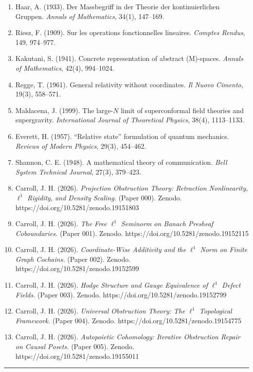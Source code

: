 \documentclass[
]{article}
\providecommand{\tightlist}{%
  \setlength{\itemsep}{0pt}\setlength{\parskip}{0pt}}
\begin{document}
\begin{enumerate}
\def\labelenumi{\arabic{enumi}.}
\tightlist
\item
  Haar, A. (1933). Der Massbegriff in der Theorie der kontinuierlichen
  Gruppen. \emph{Annals of Mathematics}, 34(1), 147--169.
\item
  Riesz, F. (1909). Sur les operations fonctionnelles lineaires.
  \emph{Comptes Rendus}, 149, 974--977.
\item
  Kakutani, S. (1941). Concrete representation of abstract (M)-spaces.
  \emph{Annals of Mathematics}, 42(4), 994--1024.
\item
  Regge, T. (1961). General relativity without coordinates. \emph{Il
  Nuovo Cimento}, 19(3), 558--571.
\item
  Maldacena, J. (1999). The large-\(N\) limit of superconformal field
  theories and supergravity. \emph{International Journal of Theoretical
  Physics}, 38(4), 1113--1133.
\item
  Everett, H. (1957). ``Relative state'' formulation of quantum
  mechanics. \emph{Reviews of Modern Physics}, 29(3), 454--462.
\item
  Shannon, C. E. (1948). A mathematical theory of communication.
  \emph{Bell System Technical Journal}, 27(3), 379--423.
\item
  Carroll, J. H. (2026). \emph{Projection Obstruction Theory: Retraction
  Nonlinearity, \(\ell^1\) Rigidity, and Density Scaling.} (Paper 000).
  Zenodo. https://doi.org/10.5281/zenodo.19151803
\item
  Carroll, J. H. (2026). \emph{The Free \(\ell^1\) Seminorm on Banach
  Presheaf Coboundaries.} (Paper 001). Zenodo.
  https://doi.org/10.5281/zenodo.19152115
\item
  Carroll, J. H. (2026). \emph{Coordinate-Wise Additivity and the
  \(\ell^1\) Norm on Finite Graph Cochains.} (Paper 002). Zenodo.
  https://doi.org/10.5281/zenodo.19152599
\item
  Carroll, J. H. (2026). \emph{Hodge Structure and Gauge Equivalence of
  \(\ell^1\) Defect Fields.} (Paper 003). Zenodo.
  https://doi.org/10.5281/zenodo.19152799
\item
  Carroll, J. H. (2026). \emph{Universal Obstruction Theory: The
  \(\ell^1\) Topological Framework.} (Paper 004). Zenodo.
  https://doi.org/10.5281/zenodo.19154775
\item
  Carroll, J. H. (2026). \emph{Autopoietic Cohomology: Iterative
  Obstruction Repair on Causal Posets.} (Paper 005). Zenodo.
  https://doi.org/10.5281/zenodo.19155011
\end{enumerate}

\begin{center}\rule{0.5\linewidth}{0.5pt}\end{center}
\end{document}
